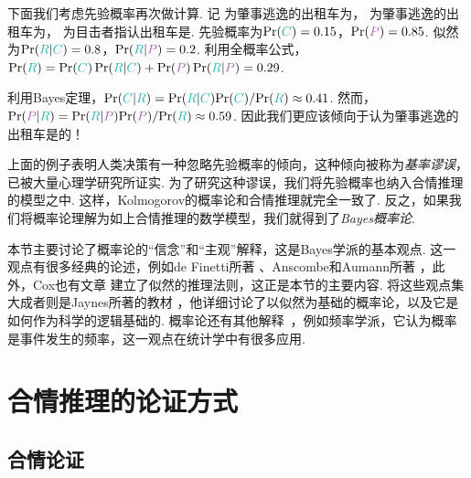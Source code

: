 下面我们考虑先验概率再次做计算. 记  为肇事逃逸的出租车为， 为肇事逃逸的出租车为， 为目击者指认出租车是. 先验概率为$\Pr(\contrastlight{C}) = 0.15$，$\Pr(\light{P}) = 0.85$. 似然为$\Pr(\contrastlight{R}|\contrastlight{C}) = 0.8$，$\Pr(\contrastlight{R}|\light{P}) = 0.2$. 利用全概率公式，$\Pr(\contrastlight{R}) = \Pr(\contrastlight{C})\Pr(\contrastlight{R}|\contrastlight{C}) + \Pr(\light{P})\Pr(\contrastlight{R}|\light{P}) = 0.29$. 
 
利用Bayes定理，$\Pr(\contrastlight{C}|\contrastlight{R}) = \Pr(\contrastlight{R}|\contrastlight{C}){\Pr(\contrastlight{C})}/{\Pr(\contrastlight{R})} \approx 0.41$. 然而，$\Pr(\light{P}|\contrastlight{R}) = \Pr(\contrastlight{R}|\light{P}){\Pr(\light{P})}/{\Pr(\contrastlight{R})} \approx 0.59$. 因此我们更应该倾向于认为肇事逃逸的出租车是的！

上面的例子表明人类决策有一种忽略先验概率的倾向，这种倾向被称为\textit{基率谬误}，已被大量心理学研究所证实\cite{kahnemanPsychologyPrediction1973,tverskyJudgmentUncertaintyHeuristics1974,bar-hillelBaserateFallacyProbability1980}. 为了研究这种谬误，我们将先验概率也纳入合情推理的模型之中. 这样，Kolmogorov的概率论和合情推理就完全一致了. 反之，如果我们将概率论理解为如上合情推理的数学模型，我们就得到了\textit{Bayes概率论}.

\begin{remark}
    本节主要讨论了概率论的“信念”和“主观”解释，这是Bayes学派的基本观点. 这一观点有很多经典的论述，例如de Finetti所著 \cite{definettiTheoryProbabilityCritical2017}、Anscombe和Aumann所著 \cite{anscombeDefinitionSubjectiveProbability1963}，此外，Cox也有文章 \cite{coxProbabilityFrequencyReasonable1946} 建立了似然的推理法则，这正是本节的主要内容. 将这些观点集大成者则是Jaynes所著的教材 \cite{jaynesProbabilityTheoryLogic2002}，他详细讨论了以似然为基础的概率论，以及它是如何作为科学的逻辑基础的. 概率论还有其他解释~\cite{hajekInterpretationsProbability2023}，例如频率学派，它认为概率是事件发生的频率，这一观点在统计学中有很多应用.
\end{remark}

\section{合情推理的论证方式}

\subsection{合情论证}\label{subsec:inductive-strong-argument}


